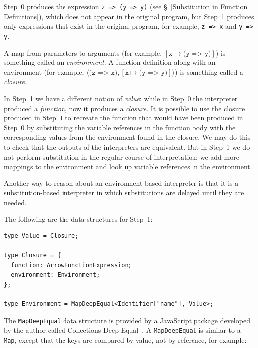 \documentclass[12pt, oneside]{book}
\begin{document}
Step~0 produces the expression \texttt{z => (y => y)} (see §~\ref{Substitution in Function Definitions}), which does not appear in the original program, but Step~1 produces only expressions that exist in the original program, for example, \texttt{z => x} and \texttt{y => y}.

\begin{mdframed}[frametitle = {Technical Terms}]
A map from parameters to arguments (for example, $[\texttt{x} \mapsto \texttt{(y => y)}]$) is something called an \emph{environment}. A function definition along with an environment (for example, $\langle \texttt{(z => x)}, [\texttt{x} \mapsto \texttt{(y => y)}] \rangle$) is something called a \emph{closure}.
\end{mdframed}

In Step~1 we have a different notion of \emph{value}: while in Step~0 the interpreter produced a \emph{function}, now it produces a \emph{closure}. It is possible to use the closure produced in Step~1 to recreate the function that would have been produced in Step~0 by substituting the variable references in the function body with the corresponding values from the environment found in the closure. We may do this to check that the outputs of the interpreters are equivalent. But in Step~1 we do not perform substitution in the regular course of interpretation; we add more mappings to the environment and look up variable references in the environment.

\begin{mdframed}[frametitle = {Alternative Argument}]
Another way to reason about an environment-based interpreter is that it is a substitution-based interpreter in which substitutions are delayed until they are needed.
\end{mdframed}

The following are the data structures for Step~1:

\begin{verbatim}
type Value = Closure;

type Closure = {
  function: ArrowFunctionExpression;
  environment: Environment;
};

type Environment = MapDeepEqual<Identifier["name"], Value>;
\end{verbatim}

The \texttt{MapDeepEqual} data structure is provided by a JavaScript package developed by the author called Collections Deep Equal~\cite{collections-deep-equal}. A \texttt{MapDeepEqual} is similar to a \texttt{Map}, except that the keys are compared by value, not by reference, for example:
\end{document}
